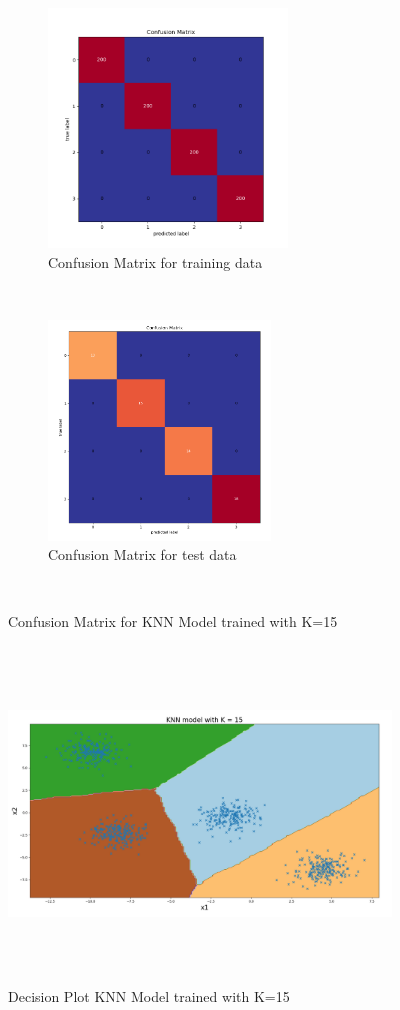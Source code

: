 \begin{figure}[!ht]
    \centering
    \begin{subfigure}[t]{0.5\textwidth}
        \centering
        \includegraphics[height=2.5in]{Dataset_1a/K_15_cmatrix_train_data.png}
        \caption{Confusion Matrix for training data}
    \end{subfigure}%
    ~ 
    \begin{subfigure}[t]{0.5\textwidth}
        \centering
        \includegraphics[height=2.3in]{Dataset_1a/K_15_cmatrix_test_data.png}
        \caption{Confusion Matrix for test data}
    \end{subfigure}%
    ~
    \caption{Confusion Matrix for KNN Model trained with K=15}
    \label{fig:5}
\end{figure}
\begin{figure}[!ht]
    \centering
    \includegraphics[height=3.5in,width=4in]{Dataset_1a/K_15_decision_plot.png}
    \caption{Decision Plot KNN Model trained with K=15}
    \label{fig:6}
\end{figure}

